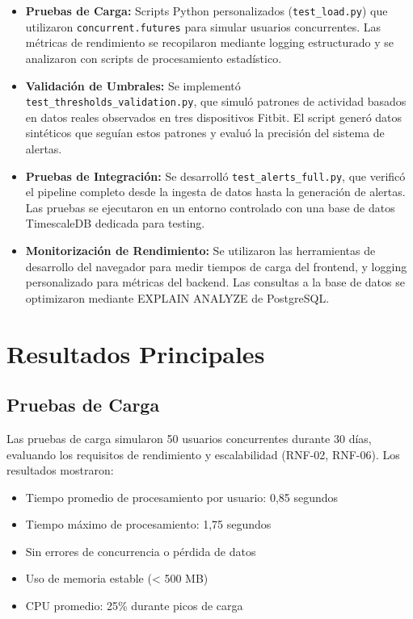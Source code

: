 \begin{itemize}
    \item \textbf{Pruebas de Carga:} Scripts Python personalizados (\texttt{test\_load.py}) que utilizaron \texttt{concurrent.futures} para simular usuarios concurrentes. Las métricas de rendimiento se recopilaron mediante logging estructurado y se analizaron con scripts de procesamiento estadístico.
    \item \textbf{Validación de Umbrales:} Se implementó \texttt{test\_thresholds\_validation.py}, que simuló patrones de actividad basados en datos reales observados en tres dispositivos Fitbit. El script generó datos sintéticos que seguían estos patrones y evaluó la precisión del sistema de alertas.
    \item \textbf{Pruebas de Integración:} Se desarrolló \texttt{test\_alerts\_full.py}, que verificó el pipeline completo desde la ingesta de datos hasta la generación de alertas. Las pruebas se ejecutaron en un entorno controlado con una base de datos TimescaleDB dedicada para testing.
    \item \textbf{Monitorización de Rendimiento:} Se utilizaron las herramientas de desarrollo del navegador para medir tiempos de carga del frontend, y logging personalizado para métricas del backend. Las consultas a la base de datos se optimizaron mediante EXPLAIN ANALYZE de PostgreSQL.
\end{itemize}

\section{Resultados Principales}
\label{sec:resultados_principales}

\subsection{Pruebas de Carga}
Las pruebas de carga simularon 50 usuarios concurrentes durante 30 días, evaluando los requisitos de rendimiento y escalabilidad (RNF-02, RNF-06). Los resultados mostraron:
\begin{itemize}
    \item Tiempo promedio de procesamiento por usuario: 0,85 segundos
    \item Tiempo máximo de procesamiento: 1,75 segundos
    \item Sin errores de concurrencia o pérdida de datos
    \item Uso de memoria estable (< 500 MB)
    \item CPU promedio: 25\% durante picos de carga
\end{itemize}

